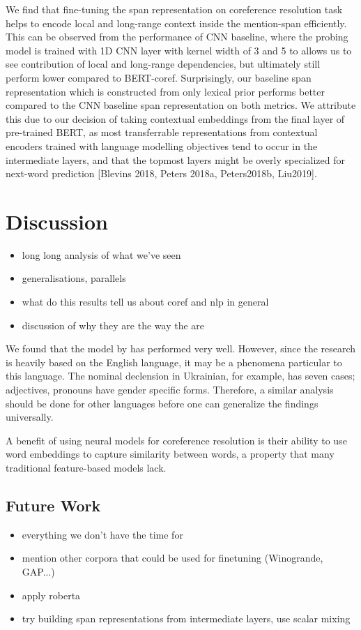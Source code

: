 \documentclass[11pt]{article}
\begin{document}
We find that fine-tuning the span representation on coreference resolution task helps to encode local and long-range context inside the mention-span efficiently. This can be observed from the performance of CNN baseline, where the probing model is trained with 1D CNN layer with kernel width of 3 and 5 to allows us to see contribution of local and long-range dependencies, but ultimately still perform lower compared to BERT-coref. Surprisingly, our baseline span representation which is constructed from only lexical prior performs better compared to the CNN baseline span representation on both metrics. We attribute this due to our decision of taking contextual embeddings from the final layer of pre-trained BERT, as most transferrable representations from contextual encoders trained with language modelling objectives tend to occur in the intermediate layers, and that the topmost layers might be overly specialized for next-word prediction [Blevins 2018, Peters 2018a, Peters2018b, Liu2019]. 
\section{Discussion}

\begin{itemize}
\item long long analysis of what we've seen
\item generalisations, parallels
\item what do this results tell us about coref and nlp in general
\item discussion of why they are the way the are
\end{itemize}

We found that the model by \textcite{joshi2019coref} has performed very well. 
However, since the research is heavily based on the English language, it may be a phenomena particular to this language. The nominal declension in Ukrainian, for example, has seven cases; adjectives, pronouns have gender specific forms. Therefore, a similar analysis should be done for other languages before one can generalize the findings universally. %

A benefit of using neural models for coreference resolution is their ability to use
word embeddings to capture similarity between words, a property that many traditional feature-based models lack.

\subsection{Future Work}
\begin{itemize}
\item everything we don't have the time for
\item mention other corpora that could be used for finetuning (Winogrande, GAP...)
\item apply roberta
\item try building span representations from intermediate layers, use scalar mixing

\end{itemize}
\end{document}
